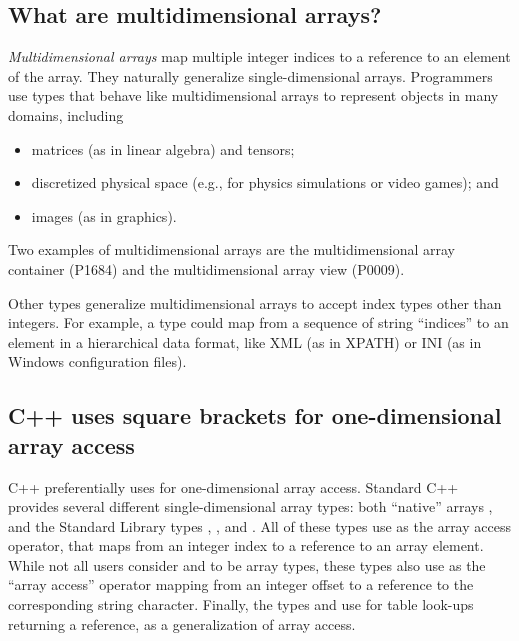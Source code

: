 \documentclass{wg21}
\begin{document}
\subsection{What are multidimensional arrays?}

\emph{Multidimensional arrays} map multiple integer indices to a reference to an element of the array.
They naturally generalize single-dimensional arrays.
Programmers use types that behave like multidimensional arrays to represent objects in many domains, including

\begin{itemize}
\item matrices (as in linear algebra) and tensors;
\item discretized physical space (e.g., for physics simulations or video games); and
\item images (as in graphics).
\end{itemize}

Two examples of multidimensional arrays are the multidimensional array container  (P1684)
and the multidimensional array view  (P0009).

Other types generalize multidimensional arrays to accept index types other than integers.
For example, a type could map from a sequence of string ``indices'' to an element in a hierarchical data format,
like XML (as in XPATH) or INI (as in Windows configuration files).

\subsection{C++ uses square brackets for one-dimensional array access}

C++ preferentially uses  for one-dimensional array access.  Standard C++ provides several different single-dimensional array types: both ``native'' arrays , and the Standard Library types , , and .  All of these types use  as the array access operator, that maps from an integer index to a reference to an array element.  While not all users consider  and  to be array types, these types also use  as the ``array access'' operator mapping from an integer offset to a reference to the corresponding string character.  Finally, the types  and  use  for table look-ups returning a reference, as a generalization of array access.
\end{document}
